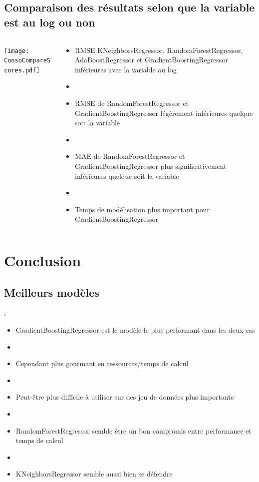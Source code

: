 \documentclass[8pt,aspectratio=169,hyperref={unicode=true}]{beamer}
\begin{document}
\subsection{Comparaison des résultats selon que la variable est au log ou non}
\begin{frame}{\insertsubsection}
  \begin{columns}
    \begin{column}{.5\textwidth}
      \centering
      \texttt{[image: ConsoCompareScores.pdf]}
    \end{column}
    \begin{column}{.5\textwidth}
      \begin{itemize}
        \item RMSE KNeighborsRegressor, RandomForestRegressor, AdaBoostRegressor et
              GradientBoostingRegressor inférieures avec la variable au log
        \item[]
        \item RMSE de RandomForestRegressor et GradientBoostingRegressor légèrement
              inférieures quelque soit la variable
        \item[]
        \item MAE de RandomForestRegressor et GradientBoostingRegressor plus significativement
              inférieures quelque soit la variable
        \item[]
        \item Temps de modélisation plus important pour GradientBoostingRegressor
      \end{itemize}
    \end{column}
  \end{columns}
\end{frame}

\section{Conclusion}
\subsection{Meilleurs modèles}
\begin{frame}{\insertsection : \insertsubsection}
  \begin{itemize}
    \item GradientBoostingRegressor est le modèle le plus performant dans les deux cas
    \item[]
    \item Cependant plus gourmant en ressources/temps de calcul
    \item[]
    \item Peut-être plus difficile à utiliser sur des jeu de données plus importants
    \item[]
    \item RandomForestRegressor semble être un bon compromis entre performance et temps de calcul
    \item[]
    \item KNeighborsRegressor semble aussi bien se défendre
  \end{itemize}
\end{frame}
\end{document}
